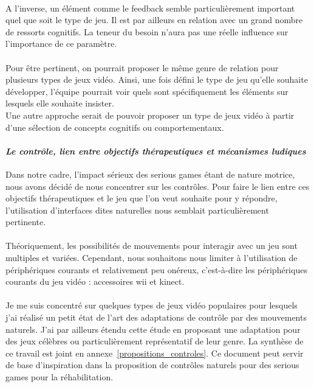 \paragraph{}A l'inverse, un élément comme le feedback semble particulièrement important quel que soit le type de jeu. Il est par ailleurs en relation avec un grand nombre de ressorts cognitifs. La teneur du besoin n'aura pas une réelle influence sur l'importance de ce paramètre.

\paragraph{}Pour être pertinent, on pourrait proposer le même genre de relation pour plusieurs types de jeux vidéo. Ainsi, une fois défini le type de jeu qu'elle souhaite développer, l'équipe pourrait voir quels sont spécifiquement les éléments sur lesquels elle souhaite insister. \\
Une autre approche serait de pouvoir proposer un type de jeux vidéo à partir d'une sélection de concepts cognitifs ou comportementaux.

			\paragraph{\emph{Le contrôle, lien entre objectifs thérapeutiques et mécanismes ludiques}\\}
Dans notre cadre, l'impact sérieux des serious games étant de nature motrice, nous avons décidé de nous concentrer sur les contrôles. Pour faire le lien entre ces objectifs thérapeutiques et le jeu que l’on veut souhaite pour y répondre, l’utilisation d’interfaces dites naturelles nous semblait particulièrement pertinente. 

\paragraph{} 
Théoriquement, les possibilités de mouvements pour interagir avec un jeu sont multiples et variées. Cependant, nous souhaitons nous limiter à l'utilisation de périphériques courants et relativement peu onéreux, c'est-à-dire les périphériques courants du jeu vidéo : accessoires wii et kinect.

\paragraph{} Je me suis concentré sur quelques types de jeux vidéo populaires pour lesquels j'ai réalisé un petit état de l'art des adaptations de contrôle par des mouvements naturels. J'ai par ailleurs étendu cette étude en proposant une adaptation pour des jeux célèbres ou particulièrement représentatif de leur genre.
La synthèse de ce travail est joint en annexe~\ref{propositions_controles}. Ce document peut servir de base d'inspiration dans la proposition de contrôles naturels pour des serious games pour la réhabilitation.

